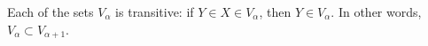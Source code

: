 Each of the sets $V_\alpha$ is transitive: if $Y \in X \in V_\alpha$, then $Y \in V_\alpha$. In other words, $V_\alpha \subset V_{\alpha+1}$.
